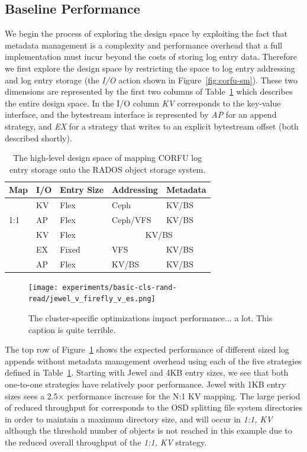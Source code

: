 \documentclass[10pt,twocolumn]{article}
\begin{document}
\subsection{Baseline Performance}

We begin the process of exploring the design space by exploiting the fact that
metadata management is a complexity and performance overhead that a full
implementation must incur beyond the costs of storing log entry data.
Therefore we first explore the design space by restricting the
space to log entry addressing and log entry storage (the \emph{I/O} action
shown in Figure~\ref{fig:corfu-sm}).  These two dimensions are
represented by the first two columns of Table~\ref{tab:pd-map} which describes
the entire design space. In the I/O column \emph{KV} corresponds to the
key-value interface, and the bytestream interface is represented by \emph{AP}
for an append strategy, and \emph{EX} for a strategy that writes to an
explicit bytestream offset (both described shortly).

\begin{table}[h]
\begin{tabular}{ | l | l | l | l | l |}
\hline
Map & I/O & Entry Size & Addressing & Metadata \\ \hline
\multirow{3}{*}{1:1} & KV  & Flex     & Ceph      & KV/BS \\ \cline{2-5}
                     & AP  & Flex     & Ceph/VFS  & KV/BS \\ \hline
\multirow{4}{*}{N:1} & KV  & Flex     & \multicolumn{2}{|c|}{KV/BS} \\ \cline{2-5}
                     & EX  & Fixed    & VFS       & KV/BS \\ \cline{2-5}
                     & AP  & Flex     & KV/BS     & KV/BS \\
\hline
\end{tabular}
\caption{The high-level design space of mapping CORFU log entry storage onto
the RADOS object storage system.}
\label{tab:pd-map}
\end{table}

\begin{figure}[t]
	\centering
	\texttt{[image: experiments/basic-cls-rand-read/jewel\_v\_firefly\_v\_es.png]}
	\caption{The cluster-specific optimizations impact performance... a lot. This caption is quite terrible.
	\label{fig:jewel_v_firefly_v_es}}
\end{figure}

The top row of Figure~\ref{fig:jewel_v_firefly_v_es} shows the expected
performance of different sized log appends without metadata management overhead
using each of the five strategies defined in Table~\ref{tab:pd-map}.  Starting
with Jewel and 4KB entry sizes, we see that both one-to-one strategies have
relatively poor performance. Jewel with 1KB entry sizes sees a 2.5\(\times\)
performance increase for the N:1 KV mapping. The large period of reduced
throughput for corresponds to the OSD splitting file system directories in
order to maintain a maximum directory size, and will occur in \emph{1:1, KV}
although the threshold number of objects is not reached in this example due to
the reduced overall throughput of the \emph{1:1, KV} strategy.
\end{document}
